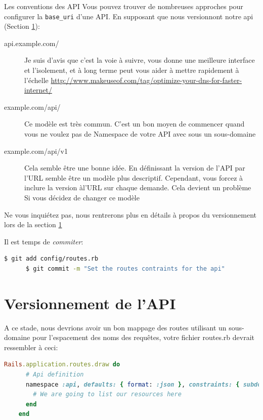 \documentclass[]{report}
\begin{document}
      \begin{tcolorbox}{Les conventions des API}
        Vous pouvez trouver de nombreuses approches pour configurer la \verb|base_uri| d'une API. En supposant que nous versionnont notre api (Section \ref{section:api_versioning}):

        \begin{description}
          \item[api.example.com/] Je suis d'avis que c'est la voie à suivre, vous donne une meilleure interface et l'isolement, et à long terme peut vous aider à mettre rapidement à l'échelle \url{http://www.makeuseof.com/tag/optimize-your-dns-for-faster-internet/}
          \item[example.com/api/] Ce modèle est très commun. C'est un bon moyen de commencer quand vous ne voulez pas de Namespace de votre API avec sous un sous-domaine
          \item[example.com/api/v1] Cela semble être une bonne idée. En définissant la version de l'API par l'URL semble être un modèle plus descriptif. Cependant, vous forcez à inclure la version àl'URL sur chaque demande. Cela devient un problème Si vous décidez de changer ce modèle
        \end{description}

        Ne vous inquiétez pas, nous rentrerons plus en détails à propos du versionnement lors de la section \ref{section:api_versioning}

      \end{tcolorbox}

      Il est temps de \textit{commiter}:

      \begin{scriptsize}
      \begin{lstlisting}[language=bash]
      $ git add config/routes.rb
      $ git commit -m "Set the routes contraints for the api"
      \end{lstlisting}
      \end{scriptsize}

  \section{Versionnement de l'API}\label{section:api_versioning}

    A ce stade, nous devrions avoir un bon mappage des routes utilisant un sous-domaine pour l'espacement des noms des requêtes, votre fichier routes.rb devrait ressembler à ceci:

    \begin{scriptsize}
    \begin{lstlisting}[language=ruby]
    Rails.application.routes.draw do
      # Api definition
      namespace :api, defaults: { format: :json }, constraints: { subdomain: 'api' }, path: '/'  do
        # We are going to list our resources here
      end
    end
    \end{lstlisting}
    \end{scriptsize}
\end{document}
